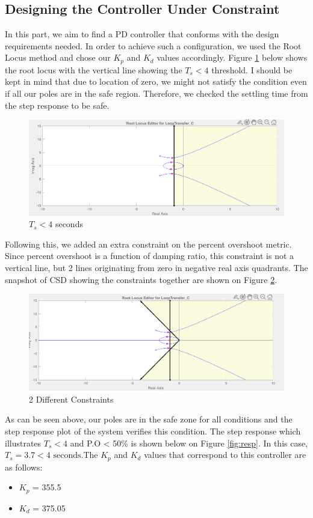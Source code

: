 \subsection{Designing the Controller Under Constraint}
In this part, we aim to find a PD controller that conforms with the design requirements needed. In order to achieve such a configuration, we used the Root Locus method and chose our $K_p$ and $K_d$ values accordingly. Figure \ref{fig:dr1} below shows the root locus with the vertical line showing the $T_s < 4$ threshold. I should be kept in mind that due to location of zero, we might not satisfy the condition even if all our poles are in the safe region. Therefore, we checked the settling time from the step response to be safe. 

\begin{figure}[H]
    \centering
    \includegraphics[width=.8\textwidth]{images/dr_1.png}
    \caption{$T_s < 4$ seconds}
    \label{fig:dr1}
\end{figure}

Following this, we added an extra constraint on the percent overshoot metric. Since percent overshoot is a function of damping ratio, this constraint is not a vertical line, but 2 lines originating from zero in negative real axis quadrants. The snapshot of CSD showing the constraints together are shown on Figure \ref{fig:dr2}. 

\begin{figure}[H]
    \centering
    \includegraphics[width=.8\textwidth]{images/dr_2.png}
    \caption{2 Different Constraints}
    \label{fig:dr2}
\end{figure}

As can be seen above, our poles are in the safe zone for all conditions and the step response plot of the system verifies this condition. The step response which illustrates $T_s < 4$ and P.O < 50\% is shown below on Figure \ref{fig:resp}. In this case, $T_s = 3.7 < 4\text{ seconds}$.The $K_p$ and $K_d$ values that correspond to this controller are as follows:
\begin{itemize}
    \item $K_p$ = 355.5
    \item $K_d$ = 375.05
\end{itemize}

